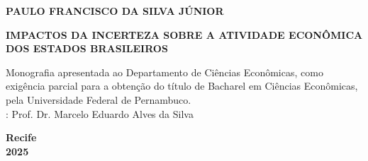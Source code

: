 \setcounter{page}{1}
\begin{center}
    \textbf{\uppercase{Paulo Francisco da Silva Júnior}}
    \vspace*{5cm}

    \textbf{\uppercase{Impactos da Incerteza sobre a atividade econômica dos estados brasileiros}}
    \vspace*{5cm}

    \begin{flushright}
        \begin{minipage}{.5\textwidth}
            Monografia apresentada ao Departamento de Ciências Econômicas, como exigência parcial para a obtenção do título de Bacharel em Ciências Econômicas, pela Universidade Federal de Pernambuco.
            \vspace*{0.7cm}
            \\
            : Prof. Dr. Marcelo Eduardo Alves da Silva 
        \end{minipage}
    \end{flushright}
    
    \vspace*{\fill}
    \textbf{Recife \\ 2025}
    
    
\end{center}
\thispagestyle{empty}